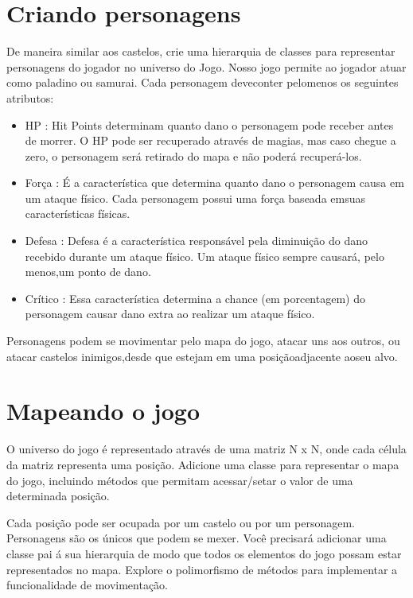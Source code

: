 \documentclass{article}
\begin{document}
\section*{Criando personagens}
De maneira similar aos castelos, crie uma hierarquia de classes para
representar personagens do jogador no universo do Jogo. Nosso jogo permite ao jogador atuar como paladino ou samurai.​ Cada​ personagem​ deve​ conter pelo​menos​ os​ seguintes atributos:
\begin{itemize}
\item HP​ : Hit Points determinam quanto dano o personagem pode receber antes de morrer. O HP pode ser recuperado através de magias, mas caso chegue a zero, o personagem será retirado do mapa e​ não poderá recuperá-los.
\item Força​ : É a característica que determina quanto dano o personagem causa em um ataque físico.​ Cada personagem​ possui​​ uma força baseada em​ suas características físicas.
\item Defesa​ : Defesa é a característica responsável pela diminuição do dano recebido durante um ataque físico. Um​ ataque​ físico sempre causará, pelo​ menos,​um​ ponto de dano.
\item Crítico​ : Essa característica determina a chance (em porcentagem) do
personagem causar dano extra ao realizar​ um​ ataque físico.
\end{itemize}
Personagens podem se movimentar pelo mapa do jogo, atacar uns aos outros, ou atacar castelos inimigos,​desde​ que​​ estejam​ em uma posição​ adjacente ao​seu alvo.

\section*{Mapeando o​ jogo}
O universo do jogo é representado através de uma matriz N x N, onde cada célula da matriz representa uma posição. Adicione uma classe para representar o mapa do jogo, incluindo métodos que permitam acessar/setar o  valor de uma determinada​​ posição.
\par Cada posição pode ser ocupada por um castelo ou por um personagem. Personagens são os únicos que podem se mexer. Você precisará adicionar uma classe pai á sua hierarquia de modo que todos os elementos do jogo possam estar representados no mapa. Explore o polimorfismo de métodos para implementar a​ funcionalidade​ de movimentação.
\end{document}
